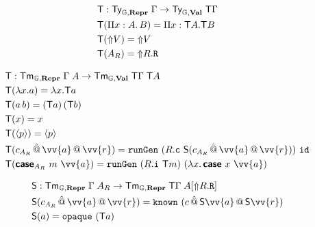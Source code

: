 \begin{align*}
   & {\textsf{T}}            : {\textsf{Ty}}_{{\mathbb{G}}, \textbf{Repr}} \; {\Gamma} \to {\textsf{Ty}}_{{\mathbb{G}}, \textbf{Val}}\; {\textsf{T}} \Gamma \\
   & {\textsf{T}}(\Pi x : A .\, B)  = \Pi x : {\textsf{T}} A . {\textsf{T}} B                                \\
   & {\textsf{T}}(\text{$\Uparrow$}{V}) = \text{$\Uparrow$}{V}                                                             \\
   & {\textsf{T}}(A_R) = \text{$\Uparrow$}{R}.\texttt{R}
\end{align*}

\begin{align*}
   & \fun T            : \Tm_{\catG, \mR} \; {\Gamma} \; A \to \Tm_{\catG, \mV}\; {\fun T \Gamma} \; \fun T A                                               \\
   & \fun T(\lambda x . a)  = \lambda x . \fun T a                                                                                                          \\
   & \fun T(a \, b)  = (\fun T a) \, (\fun T b)                                                                                                             \\
   & \fun T(x) = x                                                                                                                                          \\
   & \fun T(\quot {p}) = \quot {p}                                                                                                                          \\
   & \fun T(c_{A_R} \, \hat{@} \, \vv{a} \,@\, \vv{r}) =  \defin{runGen} \ (R.\defin{c} \ \fun S (c_{A_R} \, \hat{@} \, \vv{a} \,@\, \vv{r})) \  \defin{id} \\
   & \fun T(\inte{case}_{A_R}\ m\ \vv{a}) =  \defin{runGen} \ (R.\defin{i} \ \fun T m) \  (\lambda x.\, \inte{case}\ x \ \vv{a})                            \\
\end{align*}

\begin{align*}
   & \fun S            : \Tm_{\catG, \mR} \; {\Gamma} \; A_R \to \Tm_{\catG,\mR}\; {\fun T \Gamma} \; A[\lift{R.\defin{R}}] \\
   & \fun S(c_{A_R} \, \hat{@} \, \vv{a} \,@\, \vv{r}) = \defin{known}\ (c \, \hat{@} \, \fun S\vv{a} \,@\, \fun S\vv{r})   \\
   & \fun S(a)  = \defin{opaque}\ (\fun T a)
\end{align*}

